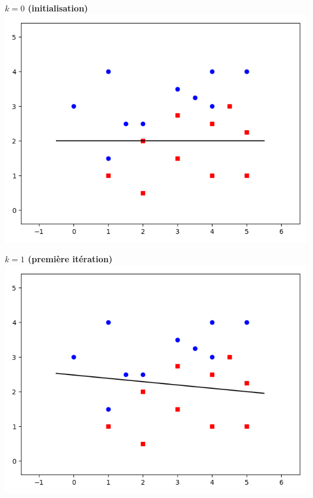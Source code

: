 \documentclass[11pt,class=report,crop=false]{standalone}
\begin{document}
\begin{exemple}
\begin{itemize}
\begin{center}
\begin{minipage}{0.45\textwidth}
\center \textbf{$k=0$ (initialisation)} 
\includegraphics[scale=\myscale,scale=0.4]{figures/retro_01_b}
\end{minipage}
\begin{minipage}{0.45\textwidth}
\center \textbf{$k=1$ (première itération)}
\includegraphics[scale=\myscale,scale=0.4]{figures/retro_01_c}
\end{minipage}


\end{center}
\end{itemize}
\end{exemple}
\end{document}
